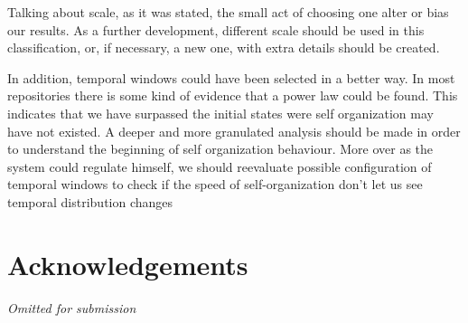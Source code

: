\documentclass[conference]{IEEEtran}
\begin{document}
Talking about scale, as it was stated, the small act of choosing one alter or bias our results. As a further development, different scale should be used in this classification, or, if necessary, a new one, with extra details should be created. 

In addition, temporal windows could have been selected in a better way. In most repositories there is some kind of evidence that a power law could be found. This indicates that we have surpassed the initial states were self organization may have not existed. A deeper and more granulated analysis should be made in order to understand the beginning of self organization behaviour. More over as the system could regulate himself, we should reevaluate possible configuration of temporal windows to check if the speed of self-organization don't let us see temporal distribution changes

\section{Acknowledgements}
\textit{Omitted for submission }

 

\end{document}
